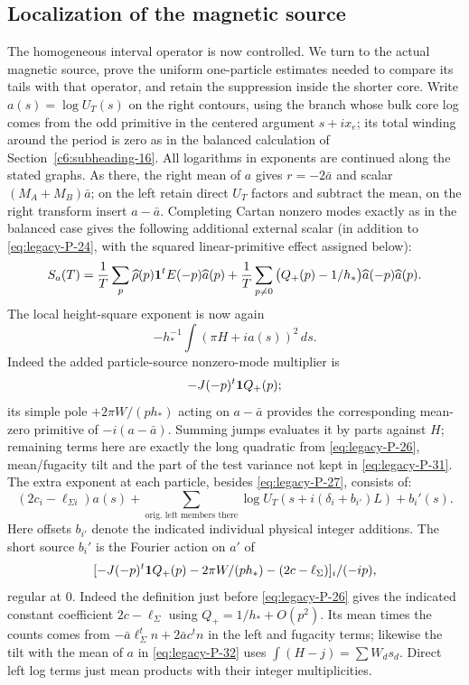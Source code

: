 \subsection{Localization of the magnetic source}
\label{u:magnetic-localization}

The homogeneous interval operator is now controlled.  We turn to the
actual magnetic source, prove the uniform one-particle estimates needed
to compare its tails with that operator, and retain the suppression
inside the shorter core.  Write \(a(s)=\log U_T(s)\) on the right contours, using the branch whose bulk core log comes from the odd primitive in the centered argument \(s+i x_e\); its total winding around the period is zero as in the balanced calculation of Section~\ref{c6:subheading-16}. All logarithms in exponents are continued along the stated graphs. As there, the right mean of \(a\) gives \(r=-2\bar a\) and scalar \((M_A+M_B)\bar a\); on the left retain direct \(U_T\) factors and subtract the mean, on the right transform insert \(a-\bar a\). Completing Cartan nonzero modes exactly as in the balanced case gives the following additional external scalar (in addition to \eqref{eq:legacy-P-24}, with the squared linear-primitive effect assigned below):
\begin{equation}
 S_a(T)=\frac1T\sum_p \widehat\rho(p){\bf1}^t E(-p)\widehat a(p)
 +\frac1T\sum_{p\ne0}\big(Q_+(p)-1/h_*\big)\widehat a(-p)\widehat a(p).
 \label{eq:legacy-P-31}
\end{equation}
The local height-square exponent is now again
\begin{equation}
 -h_*^{-1}\int (\pi H+i a(s))^2\,ds .
 \label{eq:legacy-P-32}
\end{equation}
Indeed the added particle-source nonzero-mode multiplier is 
\[
 -J(-p)^t{\bf1}Q_+(p);
\]
 its simple pole \(+2\pi W/(p h_*)\) acting on \(a-\bar a\) provides the corresponding mean-zero primitive of \(-i(a-\bar a)\). Summing jumps evaluates it by parts against \(H\); remaining terms here are exactly the long quadratic from \eqref{eq:legacy-P-26}, mean/fugacity tilt and the part of the test variance not kept in \eqref{eq:legacy-P-31}. The extra exponent at each particle, besides \eqref{eq:legacy-P-27}, consists of:
\begin{equation}
 (2c_i-\ell_{\Sigma i}) a(s)+\sum_{\text{orig. left members there}} \log U_T(s+i(\delta_i+b_{i'})L)+ b_i'(s).
 \label{eq:legacy-P-33}
\end{equation}
Here offsets \(b_{i'}\) denote the indicated individual physical integer additions. The short source \(b_i'\) is the Fourier action on \(a'\) of
\[
 [-J(-p)^t\allowbreak{\bf1}Q_+(p)-2\pi W/(p h_*)-(2c-\ell_\Sigma)]_i/(-ip),
\]
regular at 0. Indeed the definition just before \eqref{eq:legacy-P-26} gives the indicated constant coefficient \(2c-\ell_\Sigma\) using \(Q_+=1/h_*+O(p^2)\). Its mean times the counts comes from \(-\bar a \ell_\Sigma^t n+2\bar a c^t n\) in the left and fugacity terms; likewise the tilt with the mean of \(a\) in \eqref{eq:legacy-P-32} uses \(\int(H-j)=\sum W_d s_d\). Direct left log terms just mean products with their integer multiplicities.



